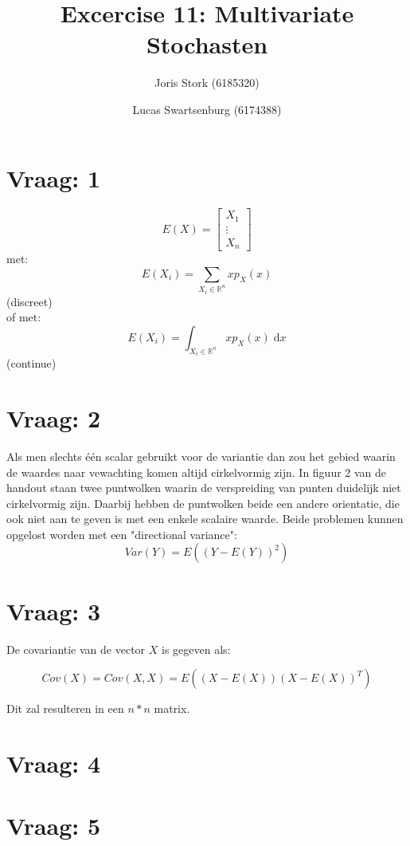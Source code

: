 \documentclass[a4paper,10pt]{article}
\author{Joris Stork (6185320) \and Lucas Swartsenburg (6174388)}
\title{Excercise 11: Multivariate Stochasten}
\begin{document}
\maketitle
\setcounter{tocdepth}{2}

\section{Vraag: 1}

$$E(X) = \begin{bmatrix} X_{1} \\ \vdots \\ X_{n} \end{bmatrix}$$
met:
$$E(X_i) = \sum_{X_i \in \mathbb{R}^n} x p_{X}(x) $$
(discreet)\\
of met:
$$E(X_i) = \int_{X_i \in \mathbb{R}^n} x p_{X}(x)\; \mathrm{d}x$$
(continue)

\section{Vraag: 2}
Als men slechts \'{e}\'{e}n scalar gebruikt voor de variantie dan zou het gebied waarin de waardes naar vewachting komen altijd cirkelvormig zijn. In figuur 2 van de handout staan twee puntwolken waarin de verspreiding van punten duidelijk niet cirkelvormig zijn. Daarbij hebben de puntwolken beide een andere orientatie, die ook niet aan te geven is met een enkele scalaire waarde. Beide problemen kunnen opgelost worden met een "directional variance": 
$$Var(Y) = E(( Y - E(Y))^2)$$

\section{Vraag: 3}
De covariantie van de vector $X$ is gegeven als:

$$ Cov(X) = Cov(X,X) = E( (X - E(X)) (X - E(X))^T )$$

Dit zal resulteren in een $n*n$ matrix.

\section{Vraag: 4}


\section{Vraag: 5}
\end{document}
